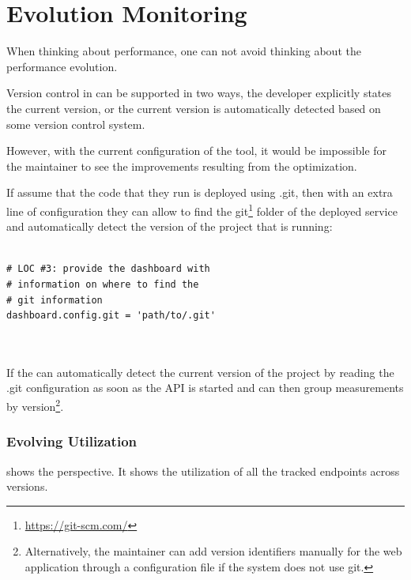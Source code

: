   
  \section{Evolution Monitoring}
  

  When thinking about performance, 
  one can not avoid thinking about the performance evolution. 

  Version control in \tool can be supported in two ways,
  the developer explicitly states the current version, 
  or the current version is automatically detected based
  on some version control system. 


  However, with the current configuration of the tool, it would be impossible for the maintainer to see the improvements resulting from the optimization. 

  If assume that the code that they run is deployed using .git, then with an extra line of configuration they can allow \tool to find the git\footnote{\url{https://git-scm.com/}} folder of the deployed service and automatically detect the version of the project that is running: 
    
\begin{lstlisting}[style=custompython]

# LOC #3: provide the dashboard with 
# information on where to find the 
# git information 
dashboard.config.git = 'path/to/.git'
  
      
\end{lstlisting}  
 
  If the \tool can automatically detect the current version of the project by reading the .git configuration as soon as the API is started and can then group measurements by version\footnote{Alternatively, the maintainer can add version identifiers manually for the web application through a configuration file if the system does not use git.}. 


  

  \subsubsection*{Evolving Utilization}

   shows the  perspective. 
  It shows the utilization of all the tracked endpoints across versions.

